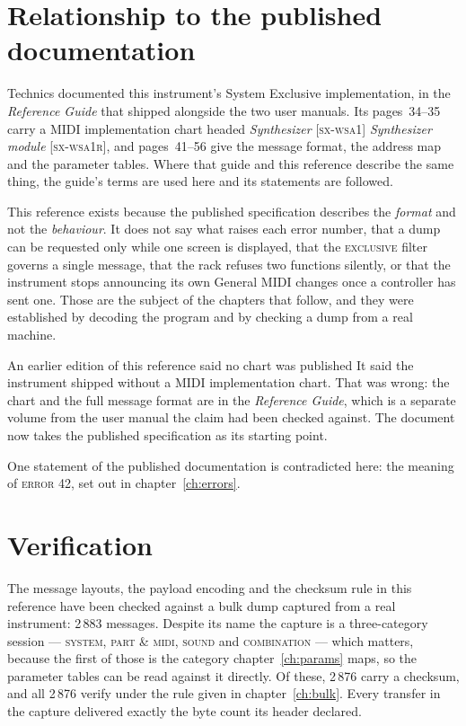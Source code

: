 \section{Relationship to the published documentation}\label{sec:published}
Technics documented this instrument's System Exclusive implementation, in the
\emph{Reference Guide} that shipped alongside the two user manuals. Its pages~34--35 carry
a MIDI implementation chart headed \emph{Synthesizer} \textsc{[sx-wsa1]}
\emph{Synthesizer module} \textsc{[sx-wsa1r]}, and pages~41--56 give the message format,
the address map and the parameter tables. Where that guide and this reference describe the
same thing, the guide's terms are used here and its statements are followed.

This reference exists because the published specification describes the \emph{format} and
not the \emph{behaviour}. It does not say what raises each error number, that a dump can be
requested only while one screen is displayed, that the \textsc{exclusive} filter governs a
single message, that the rack refuses two functions silently, or that the instrument stops
announcing its own General MIDI changes once a controller has sent one. Those are the
subject of the chapters that follow, and they were established by decoding the program and
by checking a dump from a real machine.

\begin{note}{An earlier edition of this reference said no chart was published}
It said the instrument shipped without a MIDI implementation chart. That was wrong: the
chart and the full message format are in the \emph{Reference Guide}, which is a separate
volume from the user manual the claim had been checked against. The document now takes the
published specification as its starting point.
\end{note}

One statement of the published documentation is contradicted here: the meaning of
\textsc{error 42}, set out in chapter~\ref{ch:errors}.

\section{Verification}
The message layouts, the payload encoding and the checksum rule in this reference have been
checked against a bulk dump captured from a real instrument: 2\,883 messages. Despite its
name the capture is a three-category session --- \textsc{system, part \& midi},
\textsc{sound} and \textsc{combination} --- which matters, because the first of those is
the category chapter~\ref{ch:params} maps, so the parameter tables can be read against it
directly. Of these, 2\,876 carry a checksum, and
all 2\,876 verify under the rule given in chapter~\ref{ch:bulk}. Every transfer in the capture
delivered exactly the byte count its header declared.

